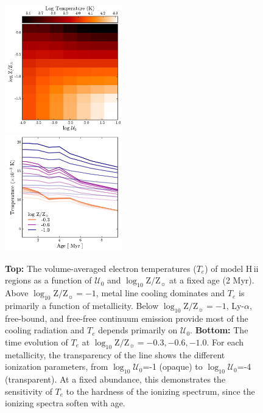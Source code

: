 \documentclass[trackchanges, twocolumn, tighten]{aastex61}
\newcommand{\logten}{\ensuremath{\log_{10}}}
\newcommand{\Te}{\ensuremath{T_{e}}}
\newcommand{\hii}{H\,{\sc ii}\xspace}
\newcommand{\logz}{\ensuremath{\logten \mathrm{Z}/\mathrm{Z}_{\sun}}}
\newcommand{\logZeq}[1]{\ensuremath{\logten \mathrm{Z}/\mathrm{Z}_{\sun} = #1}}
\newcommand{\U}{\ensuremath{\mathcal{U}_{0}}}
\newcommand{\logU}{\ensuremath{\logten \mathcal{U}_0}}
\begin{document}
\begin{figure}
  \begin{centering}
    \includegraphics[width=0.45\textwidth]{f6a.pdf}\\
    \includegraphics[width=0.45\textwidth]{f6b.pdf}
    \caption{\textbf{Top:} The volume-averaged electron temperatures (\Te{}) of model \hii regions as a function of \U{} and \logz{} at a fixed age (2 Myr). Above \logZeq{-1}, metal line cooling dominates and \Te{} is primarily a function of metallicity. Below \logZeq{-1}, Ly-$\alpha$, free-bound, and free-free continuum emission provide most of the cooling radiation and \Te{} depends primarily on \U{}. \textbf{Bottom:} The time evolution of \Te{} at \logZeq{-0.3, -0.6, -1.0}. For each metallicity, the transparency of the line shows the different ionization parameters, from \logU{}=-1 (opaque) to \logU{}=-4 (transparent). At a fixed abundance, this demonstrates the sensitivity of \Te{} to the hardness of the ionizing spectrum, since the ionizing spectra soften with age.} 
    \label{fig:temp}
  \end{centering}
\end{figure}
\end{document}
